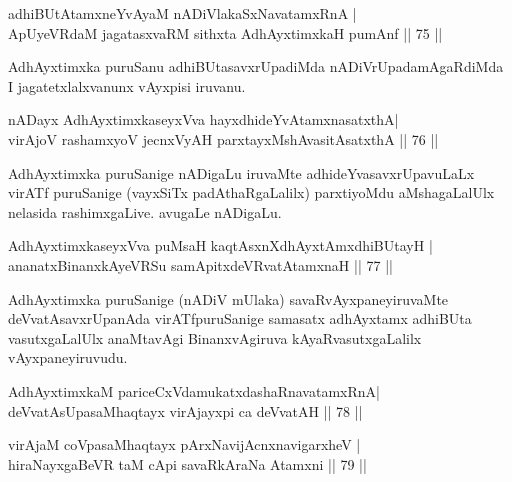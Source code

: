 \begin{shl}
adhiBUtAtamxneYvAyaM nADiVlakaSxNavatamxRnA |\\
ApUyeVRdaM jagatasxvaRM sithxta AdhAyxtimxkaH pumAnf \hfill || 75 || 
\end{shl}

\begin{artha}
AdhAyxtimxka puruSanu adhiBUtasavxrUpadiMda nADiVrUpada\break mAgaRdiMda I jagatetxlalxvanunx vAyxpisi iruvanu.
\end{artha}


\begin{shl}
nADayx AdhAyxtimxkaseyxVva hayxdhideYvAtamxnasatxthA|\\
virAjoV rashamxyoV jecnxVyAH parxtayxMshAvasitAsatxthA \hfill || 76 || 
\end{shl}

\begin{artha}
AdhAyxtimxka puruSanige nADigaLu iruvaMte adhideYvasavxrUpavuLaLx virATf puruSanige (vayxSiTx padAthaRgaLalilx) parxtiyoMdu aMshagaLalUlx nelasida rashimxgaLive. avugaLe nADigaLu.
\end{artha}

\begin{shl}
AdhAyxtimxkaseyxVva puMsaH kaqtAsxnX\s dhAyxtAmxdhiBUtayH |\\
ananatxBinanxkAyeVRSu samApitxdeVRvatAtamxnaH \hfill || 77 || 
\end{shl}

\begin{artha}
AdhAyxtimxka puruSanige (nADiV mUlaka) savaRvAyxpaneyiruvaMte deVvatAsavxrUpanAda virATfpuruSanige samasatx adhAyxtamx adhiBUta vasutxgaLalUlx anaMtavAgi BinanxvAgiruva kAyaRvasutxgaLalilx vAyxpaneyiruvudu.
\end{artha}


\begin{shl}
AdhAyxtimxkaM pariceCxVdamukatxdashaRnavatamxRnA|\\
deVvatAsUpasaMhaqtayx virAjayxpi ca deVvatAH \hfill || 78 || 
\end{shl}

\begin{shl}
virAjaM coVpasaMhaqtayx pArxNavijAcnxnavigarxheV |\\
hiraNayxgaBeVR taM cApi savaRkAraNa Atamxni \hfill || 79 || 
\end{shl}

